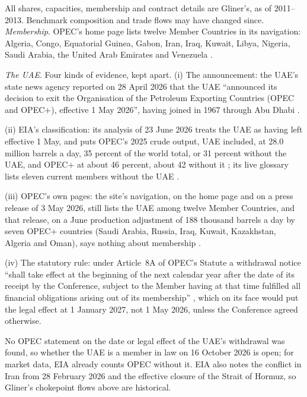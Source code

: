 \begin{qfdefinition}
 All shares, capacities, membership and contract details are Gliner's, as of 2011--2013. Benchmark composition and trade flows may have changed since. \emph{Membership}. OPEC's home page lists twelve Member Countries in its navigation: Algeria, Congo, Equatorial Guinea, Gabon, Iran, Iraq, Kuwait, Libya, Nigeria, Saudi Arabia, the United Arab Emirates and Venezuela \citep[home page navigation]{opec-home-2026}.

\emph{The UAE}. Four kinds of evidence, kept apart. (i) The announcement: the UAE's state news agency reported on 28 April 2026 that the UAE ``announced its decision to exit the Organisation of the Petroleum Exporting Countries (OPEC and OPEC+), effective 1 May 2026'', having joined in 1967 through Abu Dhabi \citep[pp.~1--2]{wam-uae-opec-2026}.

(ii) EIA's classification: its analysis of 23 June 2026 treats the UAE as having left effective 1 May, and puts OPEC's 2025 crude output, UAE included, at 28.0 million barrels a day, 35 percent of the world total, or 31 percent without the UAE, and OPEC+ at about 46 percent, about 42 without it \citep[web page]{eia-uae-opec-2026}; its live glossary lists eleven current members without the UAE \citep[glossary entry]{eia-opec-glossary}.

(iii) OPEC's own pages: the site's navigation, on the home page and on a press release of 3 May 2026, still lists the UAE among twelve Member Countries, and that release, on a June production adjustment of 188 thousand barrels a day by seven OPEC+ countries (Saudi Arabia, Russia, Iraq, Kuwait, Kazakhstan, Algeria and Oman), says nothing about membership \citep[release and site navigation]{opec-pr-2026-05-03}.

(iv) The statutory rule: under Article~8A of OPEC's Statute a withdrawal notice ``shall take effect at the beginning of the next calendar year after the date of its receipt by the Conference, subject to the Member having at that time fulfilled all financial obligations arising out of its membership'' \citep[2021 edition, Art.~8A, PDF p.~12]{opec-statute-2021}, which on its face would put the legal effect at 1 January 2027, not 1 May 2026, unless the Conference agreed otherwise.

No OPEC statement on the date or legal effect of the UAE's withdrawal was found, so whether the UAE is a member in law on 16 October 2026 is open; for market data, EIA already counts OPEC without it. EIA also notes the conflict in Iran from 28 February 2026 and the effective closure of the Strait of Hormuz, so Gliner's chokepoint flows above are historical.


\end{qfdefinition}
